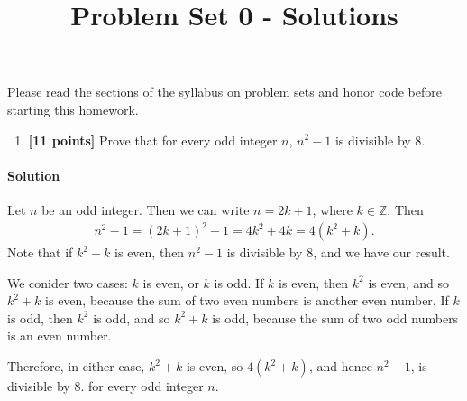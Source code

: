\documentclass[11pt]{article}
\title{Problem Set 0 - Solutions}
\author{}
\date{}
\begin{document}
\maketitle

Please read the sections of the syllabus on problem sets and honor code before starting this homework.


\begin{enumerate}
\item  \textbf{[11 points]} Prove that for every odd integer $n$, $n^2-1$ is divisible by 8. 

\end{enumerate}

{\paragraph{Solution} Let $n$ be an odd integer. Then we can write $n=2k+1$, where $k\in \mathbb{Z}.$ Then
\begin{align}
n^2-1=(2k+1)^2-1=4k^2+4k=4(k^2+k).
\end{align}
Note that if $k^2+k$ is even, then $n^2-1$ is divisible by $8$, and we have our result.

We conider two cases: $k$ is even, or $k$ is odd. If $k$ is even, then $k^2$ is even, and so $k^2+k$ is even, because the sum of two even numbers is another even number. If $k$ is odd, then $k^2$ is odd, and so $k^2+k$ is odd, because the sum of two odd numbers is an even number.

Therefore, in either case, $k^2+k$ is even, so $4(k^2+k)$, and hence $n^2-1$, is divisible by $8.$ for every odd integer $n$.}
\end{document}
